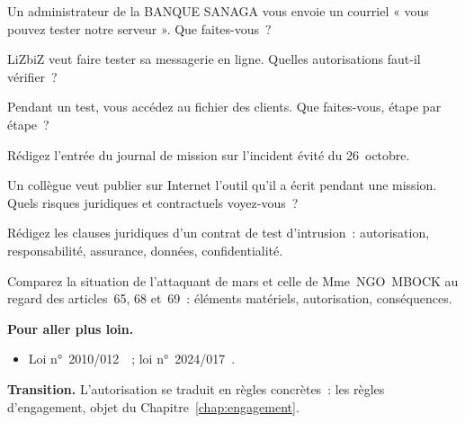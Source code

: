 \begin{boxexo}[title={\ding{45}\quad Exercice~2.4. Qui autorise~? \niveaumoyen}]
Un administrateur de la BANQUE SANAGA vous envoie un courriel « vous pouvez
tester notre serveur ». Que faites-vous~?
\end{boxexo}

\begin{boxexo}[title={\ding{45}\quad Exercice~2.5. Le nuage \niveaumoyen}]
LiZbiZ veut faire tester sa messagerie en ligne. Quelles autorisations
faut-il vérifier~?
\end{boxexo}

\begin{boxexo}[title={\ding{45}\quad Exercice~2.6. Les données \niveaumoyen}]
Pendant un test, vous accédez au fichier des clients. Que faites-vous,
étape par étape~?
\end{boxexo}

\begin{boxexo}[title={\ding{45}\quad Exercice~2.7. L'incident évité \niveaumoyen}]
Rédigez l'entrée du journal de mission sur l'incident évité du 26~octobre.
\end{boxexo}

\begin{boxexo}[title={\ding{45}\quad Exercice~2.8. L'outil \niveaumoyen}]
Un collègue veut publier sur Internet l'outil qu'il a écrit pendant une
mission. Quels risques juridiques et contractuels voyez-vous~?
\end{boxexo}

\begin{boxexo}[title={\ding{45}\quad Exercice~2.9. Le contrat \niveauexpert}]
Rédigez les clauses juridiques d'un contrat de test d'intrusion~:
autorisation, responsabilité, assurance, données, confidentialité.
\end{boxexo}

\begin{boxexo}[title={\ding{45}\quad Exercice~2.10. Comparer \niveauexpert}]
Comparez la situation de l'attaquant de mars et celle de Mme~NGO~MBOCK
au regard des articles~65, 68 et~69~: éléments matériels, autorisation,
conséquences.
\end{boxexo}

\bigskip

\begin{boxinfo}
\textbf{Pour aller plus loin.}
\begin{itemize}
    \item Loi n°~2010/012~\cite{loi2010012}~; loi n°~2024/017~\cite{loi2024017}.
\end{itemize}
\end{boxinfo}

\begin{boxinfo}
\textbf{Transition.} L'autorisation se traduit en règles concrètes~: les
règles d'engagement, objet du Chapitre~\ref{chap:engagement}.
\end{boxinfo}
